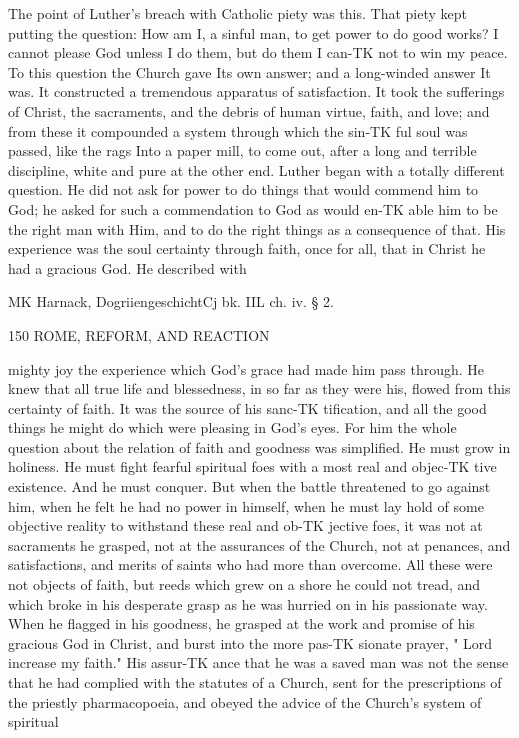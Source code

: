 \documentclass[12pt,a5paper,oneside]{book}
\begin{document}
{The point of Luther's breach with Catholic piety 
was this. That piety kept putting the question: How 
am I, a sinful man, to get power to do good works? I 
cannot please God unless I do them, but do them I can-TK
not to win my peace. To this question the Church 
gave Its own answer; and a long-winded answer It was. 
It constructed a tremendous apparatus of satisfaction. 
It took the sufferings of Christ, the sacraments, and 
the debris of human virtue, faith, and love; and from 
these it compounded a system through which the sin-TK
ful soul was passed, like the rags Into a paper mill, to 
come out, after a long and terrible discipline, white 
and pure at the other end. Luther began with a 
totally different question. He did not ask for power 
to do things that would commend him to God; he 
asked for such a commendation to God as would en-TK
able him to be the right man with Him, and to do the 
right things as a consequence of that. His experience 
was the soul certainty through faith, once for all, that 
in Christ he had a gracious God. He described with 

MK Harnack, DogriiengeschichtCj bk. IIL ch. iv. § 2. 



150 ROME, REFORM, AND REACTION 

mighty joy the experience which God's grace had 
made him pass through. He knew that all true life 
and blessedness, in so far as they were his, flowed from 
this certainty of faith. It was the source of his sanc-TK
tification, and all the good things he might do which 
were pleasing in God's eyes. For him the whole 
question about the relation of faith and goodness was 
simplified. He must grow in holiness. He must 
fight fearful spiritual foes with a most real and objec-TK
tive existence. And he must conquer. But when 
the battle threatened to go against him, when he felt 
he had no power in himself, when he must lay hold of 
some objective reality to withstand these real and ob-TK
jective foes, it was not at sacraments he grasped, not 
at the assurances of the Church, not at penances, and 
satisfactions, and merits of saints who had more than 
overcome. All these were not objects of faith, but 
reeds which grew on a shore he could not tread, and 
which broke in his desperate grasp as he was hurried 
on in his passionate way. When he flagged in his 
goodness, he grasped at the work and promise of his 
gracious God in Christ, and burst into the more pas-TK
sionate prayer, " Lord increase my faith." His assur-TK
ance that he was a saved man was not the sense that 
he had complied with the statutes of a Church, sent 
for the prescriptions of the priestly pharmacopoeia, and 
obeyed the advice of the Church's system of spiritual 



}
\end{document}
